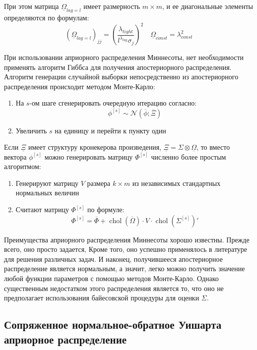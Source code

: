 \documentclass[11pt]{article} %
\DeclareMathOperator{\chol}{chol}
\newcommand{\cN}{\mathcal{N}}
\newcommand{\prior}{\underline}
\newcommand{\post}{\overline}
\begin{document}
При этом матрица $\prior \Omega_{lag=l}$ имеет размерность $m\times m$, и ее диагональные элементы определяются по формулам:
\begin{equation}
(\prior \Omega_{lag=l})_{jj} \label{prior_omega2}
=\left(\frac{\lambda_{tight}}{l^{\lambda_{lag}}\sigma_j}\right)^2
\quad
\prior \Omega_{const}=\lambda_{const}^2 
\end{equation} 

При использовании априорного распределения Миннесоты, нет необходимости применять алгоритм Гиббса для получения апостериорного распределения. Алгоритм генерации случайной выборки непосредственно из апостериорного распределения происходит методом Монте-Карло:

\begin{enumerate}
\item На $s$-ом шаге сгенерировать очередную итерацию согласно:
\begin{equation}
\phi^{[s]}\sim \cN(\post \phi; \post \Xi)
\end{equation}
\item Увеличить $s$ на единицу и перейти к пункту один
\end{enumerate}

Если $\prior \Xi$ имеет структуру кронекерова произведения, $\prior \Xi = \Sigma \otimes \prior \Omega$, то вместо вектора $\phi^{[s]}$ можно генерировать матрицу $\Phi^{[s]}$ численно более простым алгоритмом:


\begin{enumerate}
\item Генерируют матрицу $V$ размера $k\times m$  из независимых стандартных нормальных величин
\item Считают матрицу $\Phi^{[s]}$ по формуле:
\[
\Phi^{[s]} = \post \Phi + \chol(\post\Omega) \cdot V \cdot \chol(\Sigma^{[s]})'
\]
\end{enumerate}

Преимущества априорного распределения Миннесоты хорошо известны. Прежде всего, оно просто задается, Кроме того, оно успешно применялось в литературе для решения различных задач. И наконец, получившееся апостериорное распределение является нормальным, а значит, легко можно получить значение любой функции параметров с помощью методов Монте-Карло. Однако существенным недостатком этого распределения является то, что оно не предполагает использования байесовской процедуры для оценки $\Sigma$.




\subsection{Сопряженное нормальное-обратное Уишарта априорное распределение}
\end{document}
